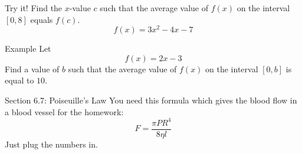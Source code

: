 \documentclass[t]{beamer}
\begin{document}
\begin{frame}{Try it!}
Find the $x$-value $c$ such that the average value of $f(x)$
on the interval $[0,8]$ equals $f(c)$.
$$f(x) = 3x^2 - 4x - 7$$
\end{frame}

\begin{frame}{Example}
Let 
$$f(x) = 2x - 3 $$
Find a value of $b$ such that the average value of $f(x)$ on the interval $[0,b]$
is equal to $10$.
\end{frame}

\begin{frame}{Section 6.7: Poiseuille's Law}
You need this formula which gives the blood flow 
in a blood vessel for the homework:
$$F = \frac{\pi P R^4}{8 \eta l}$$
Just plug the numbers in.
\end{frame}
\end{document}
